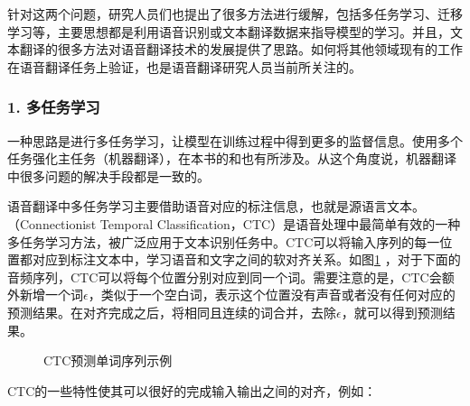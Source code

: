 \parinterval 针对这两个问题，研究人员们也提出了很多方法进行缓解，包括多任务学习、迁移学习等，主要思想都是利用语音识别或文本翻译数据来指导模型的学习。并且，文本翻译的很多方法对语音翻译技术的发展提供了思路。如何将其他领域现有的工作在语音翻译任务上验证，也是语音翻译研究人员当前所关注的。

\subsubsection{1. 多任务学习}

\parinterval 一种思路是进行多任务学习，让模型在训练过程中得到更多的监督信息。使用多个任务强化主任务（机器翻译），在本书的{\chapterfifteen}和{\chaptersixteen}也有所涉及。从这个角度说，机器翻译中很多问题的解决手段都是一致的。

\parinterval 语音翻译中多任务学习主要借助语音对应的标注信息，也就是源语言文本。{\small{}}（Connectionist Temporal Classification，CTC）是语音处理中最简单有效的一种多任务学习方法，被广泛应用于文本识别任务中。CTC可以将输入序列的每一位置都对应到标注文本中，学习语音和文字之间的软对齐关系。如图\ref{fig:17-8} ，对于下面的音频序列，CTC可以将每个位置分别对应到同一个词。需要注意的是，CTC会额外新增一个词$\epsilon$，类似于一个空白词，表示这个位置没有声音或者没有任何对应的预测结果。在对齐完成之后，将相同且连续的词合并，去除$\epsilon$，就可以得到预测结果。

\begin{figure}[htp]
\centering

\caption{CTC预测单词序列示例}
\label{fig:17-8}
\end{figure}

\parinterval CTC的一些特性使其可以很好的完成输入输出之间的对齐，例如：

